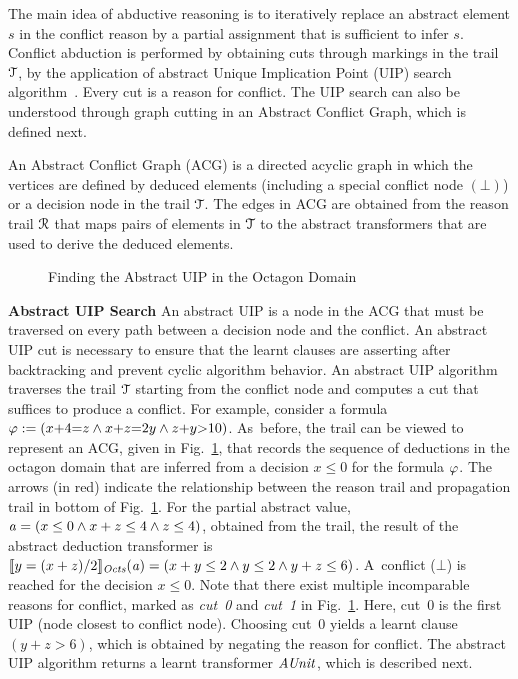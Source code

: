 The main idea of abductive  reasoning is to iteratively replace an abstract
element $s$ in the conflict reason by a partial assignment that is sufficient 
to infer $s$.  Conflict abduction is performed by obtaining cuts through markings 
in the trail $\mathcal{T}$, by the application of abstract Unique Implication Point (UIP) 
search algorithm~\cite{cdcl}.  Every cut is a reason for conflict.  The UIP
search can also be understood through graph cutting in an Abstract Conflict
Graph, which is defined next. 
\begin{definition}
  An Abstract Conflict Graph (ACG) is a directed acyclic graph in
  which the vertices are defined by deduced elements (including a
  special conflict node $(\bot)$) or a decision node in the trail
  $\mathcal{T}$.  The edges in ACG are obtained from the reason trail
  $\mathcal{R}$ that maps pairs of elements in $\mathcal{T}$ to the abstract
  transformers that are used to derive the deduced elements.  
\end{definition}
%
\begin{figure}[t]
\centering
{}
\caption{\label{uip}Finding the Abstract UIP in the Octagon Domain}
\end{figure}  
%
\noindent \textbf{Abstract UIP Search}
An abstract UIP is a node in the ACG that must be traversed on every path between a 
decision node and the conflict. An abstract UIP cut is necessary to ensure that
the learnt clauses are asserting after backtracking and prevent cyclic algorithm
behavior. 
An abstract UIP algorithm~\cite{DBLP:journals/fmsd/BrainDGHK14} traverses
the trail $\mathcal{T}$ starting from the conflict node and computes a cut that
suffices to produce a conflict.  For example, consider a formula $\varphi:=
(x{+}4{=}z \wedge x{+}z{=}2y \wedge z{+}y{>}10)$.  As~before, the trail can be
viewed to represent an ACG, given in Fig.~\ref{uip}, that records the 
sequence of deductions in the octagon domain that are inferred
from a decision $x {\leq} 0$ for the formula $\varphi$.  The arrows (in
red) indicate the relationship between the reason trail and propagation trail
in bottom of Fig.~\ref{uip}.  For the partial abstract value,
$\mathit{a}=(x\leq0 \wedge x+z\leq4 \wedge z\leq4)$, obtained from the trail,
the result of the abstract deduction transformer is
$\llbracket y=(x+z)/2 \rrbracket_{\mathit{Octs}}(\mathit{a})=(x+y\leq2 \wedge y\leq2 \wedge y+z\leq6)$. 
A~conflict ($\bot$) is reached for the decision ${x{\leq}0}$.  Note that
there exist multiple incomparable reasons for conflict, marked as {\em cut~0}
and {\em cut~1} in Fig.~\ref{uip}.  Here, cut~0 is the first UIP (node closest
to conflict node).  Choosing cut~0 yields a learnt clause $(y+z>6)$, which is
obtained by negating the reason for conflict.  The abstract UIP algorithm
returns a learnt transformer $\mathit{AUnit}$, which is described next.\\
%

